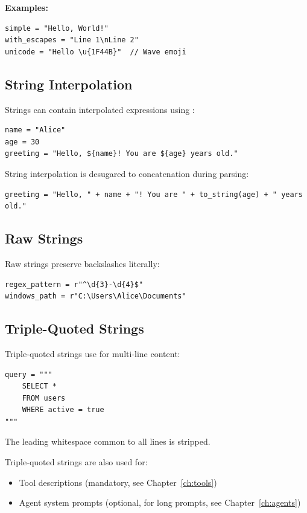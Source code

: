 \textbf{Examples:}
\begin{lstlisting}
simple = "Hello, World!"
with_escapes = "Line 1\nLine 2"
unicode = "Hello \u{1F44B}"  // Wave emoji
\end{lstlisting}

\subsection{String Interpolation}

Strings can contain interpolated expressions using :

\begin{lstlisting}
name = "Alice"
age = 30
greeting = "Hello, ${name}! You are ${age} years old."
\end{lstlisting}

\begin{implementation}
String interpolation is desugared to concatenation during parsing:
\begin{lstlisting}
greeting = "Hello, " + name + "! You are " + to_string(age) + " years old."
\end{lstlisting}
\end{implementation}

\subsection{Raw Strings}

Raw strings preserve backslashes literally:

\begin{lstlisting}
regex_pattern = r"^\d{3}-\d{4}$"
windows_path = r"C:\Users\Alice\Documents"
\end{lstlisting}

\subsection{Triple-Quoted Strings}

Triple-quoted strings use  for multi-line content:

\begin{lstlisting}
query = """
    SELECT *
    FROM users
    WHERE active = true
"""
\end{lstlisting}

The leading whitespace common to all lines is stripped.

Triple-quoted strings are also used for:
\begin{itemize}
    \item Tool descriptions (mandatory, see Chapter~\ref{ch:tools})
    \item Agent system prompts (optional, for long prompts, see Chapter~\ref{ch:agents})
\end{itemize}


